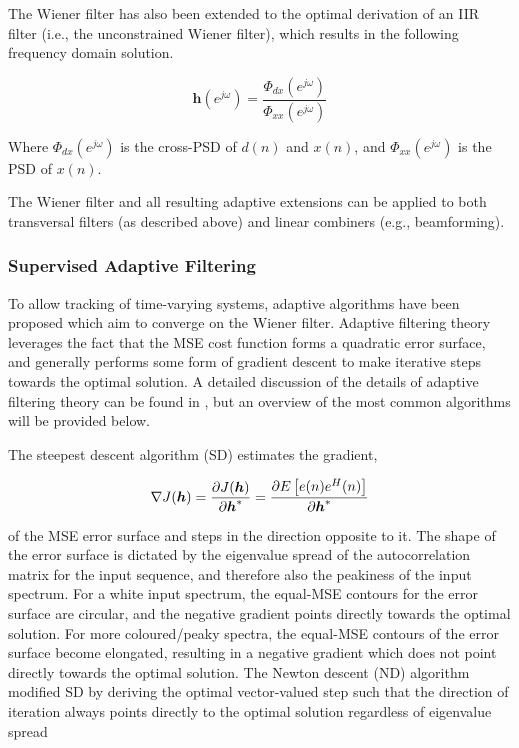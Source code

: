 The Wiener filter has also been extended to the optimal derivation of an IIR filter (i.e., the unconstrained Wiener filter), which results in the following frequency domain solution.

\begin{equation}
	\boldsymbol{h}(e^{j\omega}) = \frac{\Phi_{dx}(e^{j\omega})}{\Phi_{xx}(e^{j\omega})}
\end{equation}

\noindent
Where $\Phi_{dx}(e^{j\omega})$ is the cross-PSD of $d(n)$ and $x(n)$, and $\Phi_{xx}(e^{j\omega})$ is the PSD of $x(n)$.

The Wiener filter and all resulting adaptive extensions can be applied to both transversal filters (as described above) and linear combiners (e.g., beamforming). 

\subsubsection{Supervised Adaptive Filtering}

To allow tracking of time-varying systems, adaptive algorithms have been proposed which aim to converge on the Wiener filter. Adaptive filtering theory leverages the fact that the MSE cost function forms a quadratic error surface, and generally performs some form of gradient descent to make iterative steps towards the optimal solution. A detailed discussion of the details of adaptive filtering theory can be found in \cite{farhang2013adaptive}, but an overview of the most common algorithms will be provided below.

The steepest descent algorithm (SD) estimates the gradient,

\begin{equation}
	\bold{\nabla} J(\boldsymbol{h}) = 
	\frac{\partial J(\boldsymbol{h})}{\partial \boldsymbol{h}^*} = \frac{\partial E\left[e(n)e^H(n)\right]}{\partial \boldsymbol{h}^*} \\
\end{equation}


\noindent
of the MSE error surface and steps in the direction opposite to it. The shape of the error surface is dictated by the eigenvalue spread of the autocorrelation matrix for the input sequence, and therefore also the peakiness of the input spectrum. For a white input spectrum, the equal-MSE contours for the error surface are circular, and the negative gradient points directly towards the optimal solution. For more coloured/peaky spectra, the equal-MSE contours of the error surface become elongated, resulting in a negative gradient which does not point directly towards the optimal solution. The Newton descent (ND) algorithm modified SD by deriving the optimal vector-valued step such that the direction of iteration always points directly to the optimal solution regardless of eigenvalue spread

